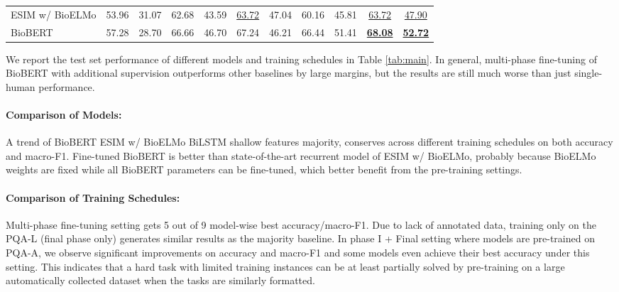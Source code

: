 \documentclass[11pt,a4paper]{article}
\begin{document}
\begin{table*}
\begin{tabular}{lcccccccccc}
        \hspace{0.1cm}ESIM w/ BioELMo & 53.96 & 31.07 & 62.68 & 43.59 & \underline{63.72} & 47.04 & 60.16 & 45.81 & \underline{63.72} & \underline{47.90} \\
        \hspace{0.1cm}BioBERT & 57.28 & 28.70 & 66.66 & 46.70 & 67.24 & 46.21 & 66.44 & 51.41 & \textbf{\underline{68.08}} & \textbf{\underline{52.72}} \\
        \bottomrule
    \end{tabular}
    \vskip -0.15cm
    \caption{Main results on PQA-L test set under reasoning-required setting. A.S.: additional supervision. with A.S. is better than without A.S. Underlined numbers are model-wise best performance, and bolded numbers are global best performance. All numbers are percentages.} \label{tab:main}
\end{table*}
We report the test set performance of different models and training schedules in Table \ref{tab:main}. In general, multi-phase fine-tuning of BioBERT with additional supervision outperforms other baselines by large margins, but the results are still much worse than just single-human performance. 

\paragraph{Comparison of Models:} A trend of BioBERT  ESIM w/ BioELMo  BiLSTM  shallow features  majority, conserves across different training schedules on both accuracy and macro-F1. Fine-tuned BioBERT is better than state-of-the-art recurrent model of ESIM w/ BioELMo, probably because BioELMo weights are fixed while all BioBERT parameters can be fine-tuned, which better benefit from the pre-training settings.

\paragraph{Comparison of Training Schedules:} Multi-phase fine-tuning setting gets 5 out of 9 model-wise best accuracy/macro-F1. Due to lack of annotated data, training only on the PQA-L (final phase only) generates similar results as the majority baseline. In phase I + Final setting where models are pre-trained on PQA-A, we observe significant improvements on accuracy and macro-F1 and some models even achieve their best accuracy under this setting. This indicates that a hard task with limited training instances can be at least partially solved by pre-training on a large automatically collected dataset when the tasks are similarly formatted.
\end{document}
